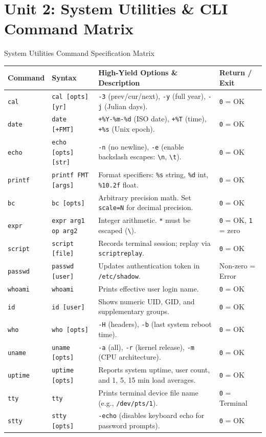 \chapter{Unit 2: System Utilities \& CLI Command Matrix}

\begin{cheatbox}{System Utilities Command Specification Matrix}
\small
\begin{tabularx}{\linewidth}{l l X l}
\toprule
\textbf{Command} & \textbf{Syntax} & \textbf{High-Yield Options \& Description} & \textbf{Return / Exit} \\
\midrule
\texttt{cal} & \texttt{cal [opts] [yr]} & \texttt{-3} (prev/cur/next), \texttt{-y} (full year), \texttt{-j} (Julian days). & \texttt{0} = OK \\
\texttt{date} & \texttt{date [+FMT]} & \texttt{+\%Y-\%m-\%d} (ISO date), \texttt{+\%T} (time), \texttt{+\%s} (Unix epoch). & \texttt{0} = OK \\
\texttt{echo} & \texttt{echo [opts] [str]} & \texttt{-n} (no newline), \texttt{-e} (enable backslash escapes: \texttt{\textbackslash n}, \texttt{\textbackslash t}). & \texttt{0} = OK \\
\texttt{printf} & \texttt{printf FMT [args]} & Format specifiers: \texttt{\%s} string, \texttt{\%d} int, \texttt{\%10.2f} float. & \texttt{0} = OK \\
\texttt{bc} & \texttt{bc [opts]} & Arbitrary precision math. Set \texttt{scale=N} for decimal precision. & \texttt{0} = OK \\
\texttt{expr} & \texttt{expr arg1 op arg2} & Integer arithmetic. \texttt{*} must be escaped (\texttt{\textbackslash*}). & \texttt{0} = OK, \texttt{1} = zero \\
\texttt{script} & \texttt{script [file]} & Records terminal session; replay via \texttt{scriptreplay}. & \texttt{0} = OK \\
\texttt{passwd} & \texttt{passwd [user]} & Updates authentication token in \texttt{/etc/shadow}. & Non-zero = Error \\
\texttt{whoami} & \texttt{whoami} & Prints effective user login name. & \texttt{0} = OK \\
\texttt{id} & \texttt{id [user]} & Shows numeric UID, GID, and supplementary groups. & \texttt{0} = OK \\
\texttt{who} & \texttt{who [opts]} & \texttt{-H} (headers), \texttt{-b} (last system reboot time). & \texttt{0} = OK \\
\texttt{uname} & \texttt{uname [opts]} & \texttt{-a} (all), \texttt{-r} (kernel release), \texttt{-m} (CPU architecture). & \texttt{0} = OK \\
\texttt{uptime} & \texttt{uptime [opts]} & Reports system uptime, user count, and 1, 5, 15 min load averages. & \texttt{0} = OK \\
\texttt{tty} & \texttt{tty} & Prints terminal device file name (e.g., \texttt{/dev/pts/1}). & \texttt{0} = Terminal \\
\texttt{stty} & \texttt{stty [opts]} & \texttt{-echo} (disables keyboard echo for password prompts). & \texttt{0} = OK \\
\bottomrule
\end{tabularx}
\end{cheatbox}

